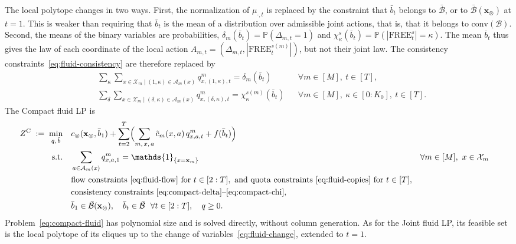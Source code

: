 \documentclass{article}
\begin{document}
The local polytope changes in two ways. First, the normalization of $\mu_{\cdot,t}$ is replaced by the constraint that
$\bar b_t$ belongs to $\bar{\mathcal{B}}$, or to $\bar{\mathcal{B}}(\mathbf{x}_\otimes)$ at $t = 1$. This is weaker than
requiring that $\bar b_t$ is the mean of a distribution over admissible joint actions, that is, that it belongs to
$\mathrm{conv}(\mathcal{B})$. Second, the means of the binary variables are probabilities, $\delta_m(\bar b_t) =
\mathbb{P}(\Delta_{m,t} = 1)$ and $\chi^{s}_\kappa(\bar b_t) = \mathbb{P}(|\text{FREE}^{s}_t| = \kappa)$. The mean $\bar
b_t$ thus gives the law of each coordinate of the local action $A_{m,t} = (\Delta_{m,t}, |\text{FREE}^{s(m)}_t|)$, but
not their joint law. The consistency constraints~\eqref{eq:fluid-consistency} are therefore replaced by
\begin{subequations}\label{eq:compact-local-cons}
\begin{align}
& \sum_\kappa\sum_{x \in \mathcal{X}_m \mid (1,\kappa)\in\mathcal{A}_m(x)} q^m_{x,(1,\kappa),t}
  =\delta_m(\bar b_t) && \forall m \in [M],\ t \in [T],
\label{eq:compact-delta}\\
& \sum_\delta\sum_{x \in \mathcal{X}_m \mid (\delta,\kappa)\in\mathcal{A}_m(x)} q^m_{x,(\delta,\kappa),t}
  =\chi^{s(m)}_\kappa(\bar b_t) && \forall m \in [M],\ \kappa \in [0:K_0],\ t \in [T].
\label{eq:compact-chi}
\end{align}
\end{subequations}
The Compact fluid LP is
\begin{subequations}\label{eq:compact-fluid}
\begin{align}
Z^{\mathrm{C}} \;:=\; \min_{q,\,\bar b} \quad
& c_\otimes(\mathbf{x}_\otimes, \bar b_1)
  + \sum_{t=2}^{T}\Bigl(\sum_{m,\, x,\, a}\tilde c_m(x,a)\,q^m_{x,a,t}+f(\bar b_t)\Bigr)
\label{eq:compact-fluid-obj}\\
\text{s.t.} \quad
& \sum_{a \in \mathcal{A}_m(x)} q^m_{x,a,1} = \mathds{1}_{\{x = \mathbf{x}_m\}}
  && \forall m \in [M],\ x \in \mathcal{X}_m
\label{eq:compact-fluid-initial}\\
& \text{flow constraints~\eqref{eq:fluid-flow} for } t \in [2:T], \text{ and quota
  constraints~\eqref{eq:fluid-copies} for } t \in [T],\nonumber\\
& \text{consistency constraints~\eqref{eq:compact-delta}--\eqref{eq:compact-chi}},\nonumber\\
& \bar b_1\in\bar{\mathcal{B}}(\mathbf{x}_\otimes),\quad
  \bar b_t\in\bar{\mathcal{B}}\ \ \forall t\in[2:T],\quad q\ge 0.\nonumber
\end{align}
\end{subequations}
Problem~\eqref{eq:compact-fluid} has polynomial size and is solved directly, without column generation. As for the
Joint fluid LP, its feasible set is the local polytope of its cliques up to the change of
variables~\eqref{eq:fluid-change}, extended to $t = 1$.
\end{document}
